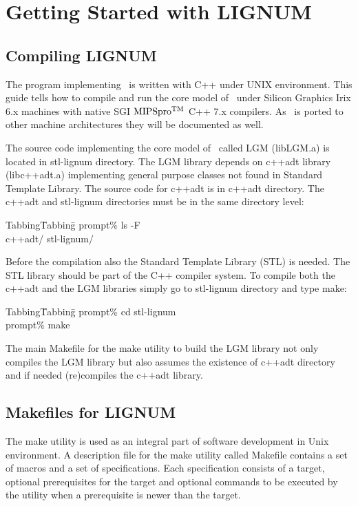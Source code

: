 \chapter{Getting Started with LIGNUM}

\section{Compiling LIGNUM}

The  program implementing  \lignum\  is written  with  C++ under  UNIX
environment. This guide tells how to compile and run the core model of
\lignum\  under Silicon  Graphics Irix  6.x machines with native SGI
$ \rm MIPSpro^{TM}$ C++ 7.x compilers.  As \lignum\ is ported to other
machine  architectures  they  will  be  documented  as  well.   


The source  code implementing  the core model  of \lignum\  called LGM
(libLGM.a) is located in stl-lignum directory. The LGM library depends
on c++adt  library (libc++adt.a) implementing  general purpose classes
not found in Standard Template Library.  The source code for c++adt is
in c++adt directory. The c++adt  and stl-lignum directories must be in
the same directory level:

\begin{tabbing}
Tabbing\= Tabbing\=\kill
\>\>prompt\% ls -F \\
\>\>c++adt/ stl-lignum/
\end{tabbing}

Before  the compilation also  the Standard  Template Library  (STL) is
needed. The STL library should be part of the C++ compiler system.  To
compile both the c++adt and  the LGM libraries simply go to stl-lignum
directory and type make:

\begin{tabbing}
Tabbing\= Tabbing\=\kill
\>\>prompt\% cd stl-lignum \\
\>\>prompt\% make
\end{tabbing}

The main  Makefile for the make  utility to build the  LGM library not
only compiles the LGM library but also assumes the existence of c++adt
directory and if needed (re)compiles the c++adt library.

\section{Makefiles for LIGNUM}

The make utility  is used as an integral  part of software development
in Unix environment.   A description file for the  make utility called
Makefile contains  a set of macros  and a set  of specifications. Each
specification  consists of  a target,  optional prerequisites  for the
target  and optional commands  to be  executed by  the utility  when a
prerequisite is newer than the target.

